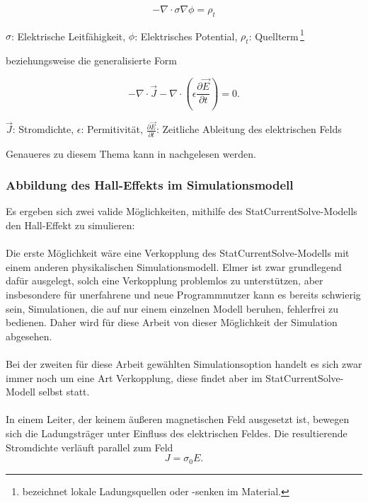 \documentclass[12pt, a4paper]{article}
\renewcommand{\footnotesize}{\fontsize{10pt}{12pt}\selectfont}
\begin{document}
\begin{equation}
	-\nabla\cdot\sigma\nabla\phi=\rho_t
	\tag{4.7}
	\label{4.7}
\end{equation}

\vspace{-0.8em}
\begin{center}
	\footnotesize
	$\sigma$: Elektrische Leitfähigkeit, $\phi$: Elektrisches Potential, $\rho_t$: Quellterm\,\footnote{bezeichnet lokale Ladungsquellen oder -senken im Material.}
\end{center}


beziehungsweise die generalisierte Form

\begin{equation}
	-\nabla\cdot\vec{J}-\nabla\cdot(\epsilon\frac{\partial\vec{E}}{\partial{t}})=0.
	\tag{4.8}
	\label{4.8}
\end{equation}

\vspace{-0.8em}
\begin{center}
	\footnotesize
	$\vec{J}$: Stromdichte, $\epsilon$: Permitivität, $\frac{\partial\vec{E}}{\partial{t}}$: Zeitliche Ableitung des elektrischen Felds
\end{center}

Genaueres zu diesem Thema kann in \cite{elmerModel} nachgelesen werden.

\subsubsection{Abbildung des Hall-Effekts im Simulationsmodell}
Es ergeben sich zwei valide Möglichkeiten, mithilfe des StatCurrentSolve-Modells den Hall-Effekt zu simulieren:\paragraph{}
Die erste Möglichkeit wäre eine Verkopplung des StatCurrentSolve-Modells mit einem anderen physikalischen Simulationsmodell. Elmer ist zwar grundlegend dafür ausgelegt, solch eine Verkopplung problemlos zu unterstützen, aber insbesondere für unerfahrene und neue Programmnutzer kann es bereits schwierig sein, Simulationen, die auf nur einem einzelnen Modell beruhen, fehlerfrei zu bedienen. Daher wird für diese Arbeit von dieser Möglichkeit der Simulation abgesehen.\paragraph{}
Bei der zweiten für diese Arbeit gewählten Simulationsoption handelt es sich zwar immer noch um eine Art Verkopplung, diese findet aber im StatCurrentSolve-Modell selbst statt.\paragraph{}
In einem Leiter, der keinem äußeren magnetischen Feld ausgesetzt ist, bewegen sich die Ladungsträger unter Einfluss des elektrischen Feldes. Die resultierende Stromdichte verläuft parallel zum Feld
\begin{equation}
	J=\sigma_0E.
	\tag{4.9}
	\label{4.9}
\end{equation}
\end{document}
